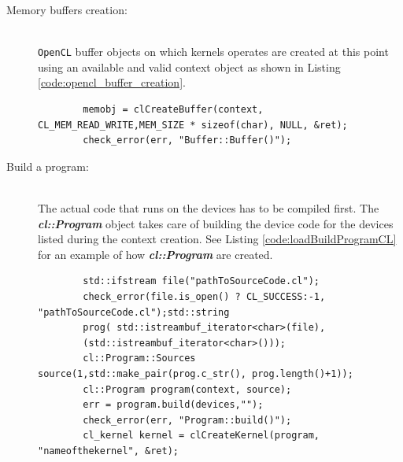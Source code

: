 \begin{description}
\begin{description}
    	\item [Memory buffers creation:]\hfil \\ \texttt{OpenCL} buffer objects on which kernels operates are created at this point using an available and valid context object as shown in Listing \ref{code:opencl_buffer_creation}. 
    	\begin{lstlisting}
    	memobj = clCreateBuffer(context, CL_MEM_READ_WRITE,MEM_SIZE * sizeof(char), NULL, &ret);
    	check_error(err, "Buffer::Buffer()");
    	\end{lstlisting}
    	
    	\item [Build a program:]\hfil \\ 
    	The actual code that runs on the devices has to be compiled first. The \textbf{\textit{cl::Program}} object takes care of building the device code for the devices listed during the context creation. See Listing
    	\ref{code:loadBuildProgramCL} for an example of how \textbf{\textit{cl::Program}} are created.
    	\begin{lstlisting}
    	std::ifstream file("pathToSourceCode.cl");
    	check_error(file.is_open() ? CL_SUCCESS:-1, "pathToSourceCode.cl");std::string
    	prog( std::istreambuf_iterator<char>(file),
    	(std::istreambuf_iterator<char>()));
    	cl::Program::Sources source(1,std::make_pair(prog.c_str(), prog.length()+1));
    	cl::Program program(context, source);
    	err = program.build(devices,"");
    	check_error(err, "Program::build()");
    	cl_kernel kernel = clCreateKernel(program, "nameofthekernel", &ret);
    	\end{lstlisting}
    	

\end{description}
\end{description}
